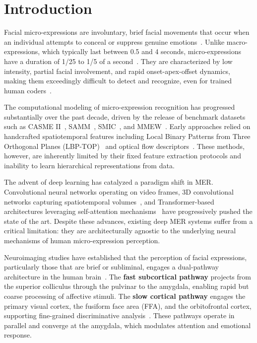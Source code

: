 
\section{Introduction}
\label{sec:introduction}

Facial micro-expressions are involuntary, brief facial movements that occur when an individual attempts to conceal or suppress genuine emotions~\cite{ekman1969nonverbal}. Unlike macro-expressions, which typically last between 0.5 and 4 seconds, micro-expressions have a duration of 1/25 to 1/5 of a second~\cite{ekman2003darwin}. They are characterized by low intensity, partial facial involvement, and rapid onset-apex-offset dynamics, making them exceedingly difficult to detect and recognize, even for trained human coders~\cite{frank2009training}.

The computational modeling of micro-expression recognition has progressed substantially over the past decade, driven by the release of benchmark datasets such as CASME II~\cite{yan2014casme2}, SAMM~\cite{yap2018samm}, SMIC~\cite{li2013smic}, and MMEW~\cite{ben2022survey}. Early approaches relied on handcrafted spatiotemporal features including Local Binary Patterns from Three Orthogonal Planes (LBP-TOP)~\cite{zhao2007lbptop} and optical flow descriptors~\cite{wang2015offapexnet}. These methods, however, are inherently limited by their fixed feature extraction protocols and inability to learn hierarchical representations from data.

The advent of deep learning has catalyzed a paradigm shift in MER. Convolutional neural networks operating on video frames, 3D convolutional networks capturing spatiotemporal volumes~\cite{tran2015c3d}, and Transformer-based architectures leveraging self-attention mechanisms~\cite{liu2022videoSwin} have progressively pushed the state of the art. Despite these advances, existing deep MER systems suffer from a critical limitation: they are architecturally agnostic to the underlying neural mechanisms of human micro-expression perception.

Neuroimaging studies have established that the perception of facial expressions, particularly those that are brief or subliminal, engages a dual-pathway architecture in the human brain~\cite{morris1999amygdala}. The \textbf{fast subcortical pathway} projects from the superior colliculus through the pulvinar to the amygdala, enabling rapid but coarse processing of affective stimuli. The \textbf{slow cortical pathway} engages the primary visual cortex, the fusiform face area (FFA), and the orbitofrontal cortex, supporting fine-grained discriminative analysis~\cite{kanwisher1997ffa}. These pathways operate in parallel and converge at the amygdala, which modulates attention and emotional response.

